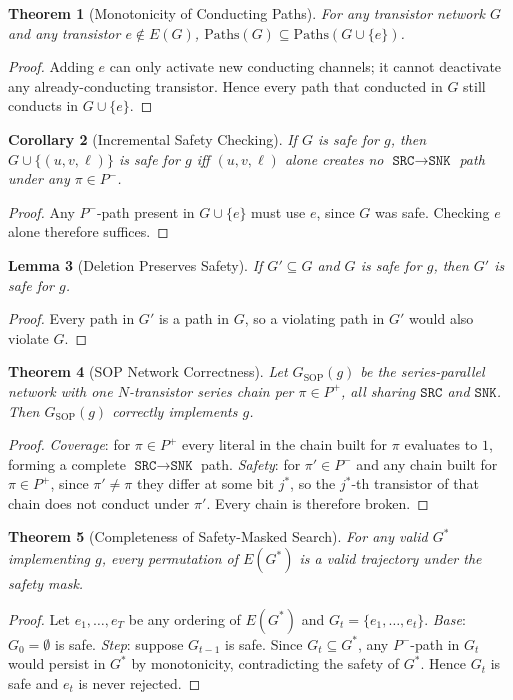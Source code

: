 \documentclass[letterpaper]{article}
\theoremstyle{plain}
\newtheorem{theorem}{Theorem}
\newtheorem{lemma}[theorem]{Lemma}
\newtheorem{corollary}[theorem]{Corollary}
\theoremstyle{definition}
\newcommand{\SRC}{\texttt{SRC}}
\newcommand{\SNK}{\texttt{SNK}}
\newcommand{\Pon}{P^{+}}
\newcommand{\Poff}{P^{-}}
\begin{document}
\begin{theorem}[Monotonicity of Conducting Paths]
\label{sthm:mono}
For any transistor network $G$ and any transistor $e \notin E(G)$,
$\mathrm{Paths}(G) \subseteq \mathrm{Paths}(G \cup \{e\})$.
\end{theorem}
\begin{proof}
Adding $e$ can only activate new conducting channels; it cannot deactivate any
already-conducting transistor.  Hence every path that conducted in $G$ still
conducts in $G \cup \{e\}$.
\end{proof}

\begin{corollary}[Incremental Safety Checking]
\label{scor:safety}
If $G$ is safe for $g$, then $G \cup \{(u,v,\ell)\}$ is safe for $g$ iff
$(u,v,\ell)$ alone creates no $\SRC \to \SNK$ path under any $\pi \in \Poff$.
\end{corollary}
\begin{proof}
Any $\Poff$-path present in $G \cup \{e\}$ must use $e$, since $G$ was safe.
Checking $e$ alone therefore suffices.
\end{proof}

\begin{lemma}[Deletion Preserves Safety]
\label{slem:deletion}
If $G' \subseteq G$ and $G$ is safe for $g$, then $G'$ is safe for $g$.
\end{lemma}
\begin{proof}
Every path in $G'$ is a path in $G$, so a violating path in $G'$ would also
violate $G$.
\end{proof}

\begin{theorem}[SOP Network Correctness]
\label{sthm:sop}
Let $G_{\mathrm{SOP}}(g)$ be the series-parallel network with one
$N$-transistor series chain per $\pi \in \Pon$, all sharing $\SRC$ and $\SNK$.
Then $G_{\mathrm{SOP}}(g)$ correctly implements $g$.
\end{theorem}
\begin{proof}
\textit{Coverage}: for $\pi \in \Pon$ every literal in the chain built for
$\pi$ evaluates to $1$, forming a complete $\SRC \to \SNK$ path.
\textit{Safety}: for $\pi' \in \Poff$ and any chain built for $\pi \in \Pon$,
since $\pi' \neq \pi$ they differ at some bit $j^*$, so the $j^*$-th
transistor of that chain does not conduct under $\pi'$.  Every chain is
therefore broken.
\end{proof}

\begin{theorem}[Completeness of Safety-Masked Search]
\label{sthm:complete}
For any valid $G^*$ implementing $g$, every permutation of $E(G^*)$ is a valid
trajectory under the safety mask.
\end{theorem}
\begin{proof}
Let $e_1,\ldots,e_T$ be any ordering of $E(G^*)$ and
$G_t = \{e_1,\ldots,e_t\}$.
\textit{Base}: $G_0 = \emptyset$ is safe.
\textit{Step}: suppose $G_{t-1}$ is safe.  Since $G_t \subseteq G^*$, any
$\Poff$-path in $G_t$ would persist in $G^*$ by monotonicity, contradicting
the safety of $G^*$.  Hence $G_t$ is safe and $e_t$ is never rejected.
\end{proof}
\end{document}
